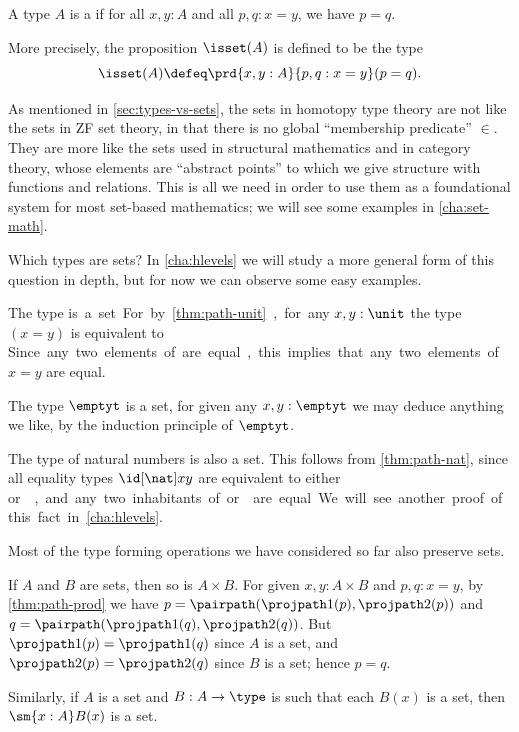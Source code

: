 \begin{defn}\label{defn:set}
  A type $A$ is a 
  if for all $x,y:A$ and all $p,q:x=y$, we have $p=q$.
\end{defn}

More precisely, the proposition $\isset(A)$ is defined to be the type
\[ \isset(A) \defeq \prd{x,y:A}{p,q:x=y} (p=q). \]

As mentioned in \cref{sec:types-vs-sets},
the sets in homotopy type theory are not like the sets in ZF set theory, in that there is no global ``membership predicate'' $\in$.
They are more like the sets used in structural mathematics and in category theory, whose elements are ``abstract points'' to which we give structure with functions and relations.
This is all we need in order to use them as a foundational system for most set-based mathematics; we will see some examples in \cref{cha:set-math}.

Which types are sets?
In \cref{cha:hlevels} we will study a more general form of this question in depth, but for now we can observe some easy examples.

\begin{eg}\label{eg:isset-unit}
  The type \unit is a set.
  For by \cref{thm:path-unit}, for any $x,y:\unit$ the type $(x=y)$ is equivalent to \unit.
  Since any two elements of \unit are equal, this implies that any two elements of $x=y$ are equal.
\end{eg}

\begin{eg}\label{eg:isset-empty}
  The type $\emptyt$ is a set, for given any $x,y:\emptyt$ we may deduce anything we like, by the induction principle of $\emptyt$.
\end{eg}

\begin{eg}\label{thm:nat-set}
  The type \nat of natural numbers is also a set.
  This follows from \cref{thm:path-nat}, since all equality types $\id[\nat]xy$ are equivalent to either \unit or \emptyt, and any two inhabitants of \unit or \emptyt are equal.
  We will see another proof of this fact in \cref{cha:hlevels}.
\end{eg}

Most of the type forming operations we have considered so far also preserve sets.

\begin{eg}\label{thm:isset-prod}
  If $A$ and $B$ are sets, then so is $A\times B$.
  For given $x,y:A\times B$ and $p,q:x=y$, by \cref{thm:path-prod} we have $p= \pairpath(\projpath1(p),\projpath2(p))$ and $q= \pairpath(\projpath1(q),\projpath2(q))$.
  But $\projpath1(p)=\projpath1(q)$ since $A$ is a set, and $\projpath2(p)=\projpath2(q)$ since $B$ is a set; hence $p=q$.

  Similarly, if $A$ is a set and $B:A\to\type$ is such that each $B(x)$ is a set, then $\sm{x:A} B(x)$ is a set.
\end{eg}

